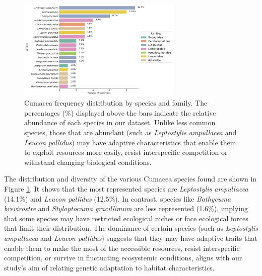 {\begin{figure}[htbp]
    \centering
    \includegraphics[width=0.7\textwidth]{figure2.jpg}
    \caption{Cumacea frequency distribution by species and family. The percentages (\%) displayed above the bars indicate the relative abundance of each species in our dataset. Unlike less common species, those that are abundant (such as \emph{Leptostylis ampullacea} and \emph{Leucon pallidus}) may have adaptive characteristics that enable them to exploit resources more easily, resist interspecific competition or withstand changing biological conditions. \label{fig:fig4}}
\end{figure}

The distribution and diversity of the various Cumacea species found are shown in Figure \ref{fig:fig4}. It shows that the most represented species are \emph{Leptostylis ampullacea} (14.1\%) and \emph{Leucon pallidus} (12.5\%). In contrast, species like \emph{Bathycuma brevirostre} and \emph{Styloptocuma gracillimum} are less represented (1.6\%), implying that some species may have restricted ecological niches or face ecological forces that limit their distribution. The dominance of certain species (such as \emph{Leptostylis ampullacea} and \emph{Leucon pallidus}) suggests that they may have adaptive traits that enable them to make the most of the accessible resources, resist interspecific competition, or survive in fluctuating ecosystemic conditions, aligns with our study’s aim of relating genetic adaptation to habitat characteristics.

}
